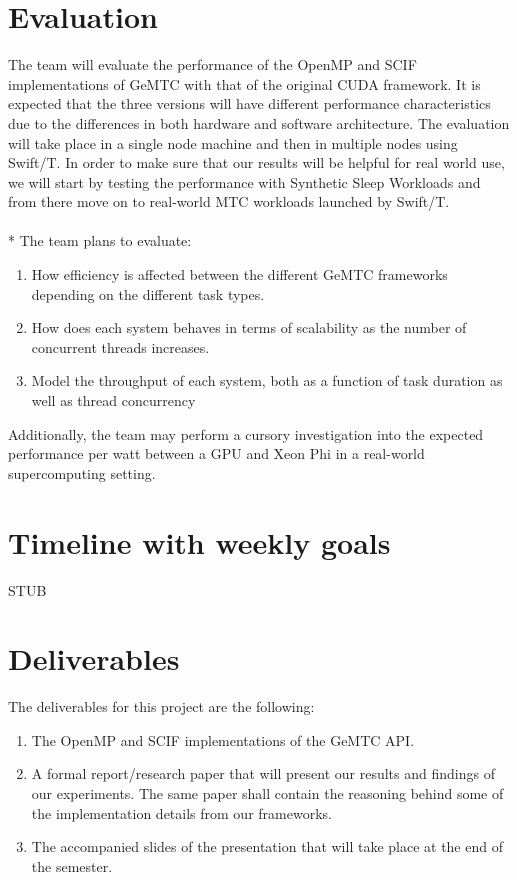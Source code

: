 \documentclass[10pt, conference, compsocconf]{IEEEtran}
\begin{document}
\section{Evaluation}
The team will evaluate the performance of the OpenMP and SCIF implementations of GeMTC with that of the original CUDA framework. It is expected that the three versions will have different performance characteristics due to the differences in both hardware and software architecture. The evaluation will take place in a single node machine and then in multiple nodes using Swift/T. In order to make sure that our results will be helpful for real world use, we will start by testing the performance with Synthetic Sleep Workloads and from there move on to real-world MTC workloads launched by Swift/T.\\
\\*
The team plans to evaluate:
\\
\begin{enumerate}
  \item How efficiency is affected between the different GeMTC frameworks depending on the different task types.
  \item How does each system behaves in terms of scalability as the number of concurrent threads increases.
  \item Model the throughput of each system, both as a function of task duration as well as thread concurrency
\end{enumerate}

Additionally, the team may perform a cursory investigation into the expected performance per watt between a GPU and Xeon Phi in a real-world supercomputing setting.

\section{Timeline with weekly goals}

STUB


\section{Deliverables}

The deliverables for this project are the following:\\

\begin{enumerate}
  \item The OpenMP and SCIF implementations of the GeMTC API.
  \item A formal report/research paper that will present our results and findings of our experiments. The same paper shall contain the reasoning behind some of the implementation details from our frameworks.
  \item The accompanied slides of the presentation that will take place at the end of the semester.
\end{enumerate}
\end{document}
